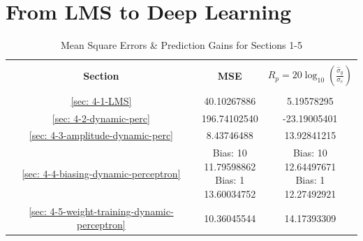 \documentclass[12pt]{article}
\begin{document}
\pagebreak
\section{From LMS to Deep Learning} \label{sec: 4-LMS-to-DL}

		\begin{minipage}[t]{0.45\textwidth}
			\begin{table}[H]
				\centering
				\begin{tabular}{|c|c|c|}
					\hline
					&&\\[-1em]
					\textbf{Section} & \textbf{MSE} & \textbf{$R_p = 20\log_{10}({\frac{\hat{\sigma}_y}{\sigma_e}})$} \\
					&&\\[-1em]
					\hline
					\hline
					\ref{sec: 4-1-LMS}	&	40.10267886		&	5.19578295 \\
					\hline
					\ref{sec: 4-2-dynamic-perc}	&	196.74102540	&	-23.19005401 \\
					\hline
					\ref{sec: 4-3-amplitude-dynamic-perc}	&	8.43746488		&	13.92841215 \\
					\hline
					\ref{sec: 4-4-biasing-dynamic-perceptron} 	&	\makecell{ Bias: 10 \\ 11.79598862 \\ Bias: 1 \\ 13.60034752 \\}		&	\makecell{ Bias: 10 \\ 12.64497671 \\ Bias: 1 \\ 12.27492921 \\} \\
					\hline
					\ref{sec: 4-5-weight-training-dynamic-perceptron}	&	10.36045544		&	14.17393309 \\
					\hline
				\end{tabular}
				\captionsetup{justification=centering}
				\caption{Mean Square Errors \& Prediction Gains for Sections 1-5}
				\label{tab: 4-mse-Rp}
			\end{table}
		\end{minipage}%
		\begin{minipage}{0.04\textwidth}
			\hspace*{0.04\textwidth}
		\end{minipage}%
\end{document}
